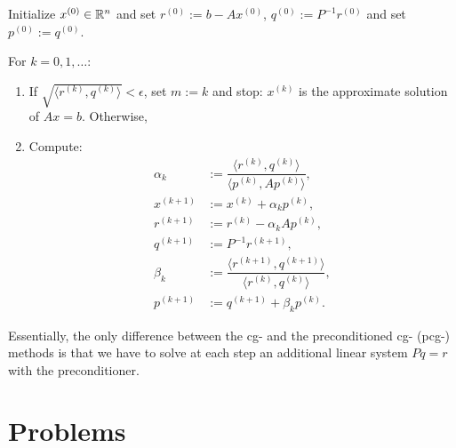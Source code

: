 \begin{algorithm}
Initialize $x^{(0)}\in\mathbb{R}^n$ and set $r^{(0)} :=b-Ax^{(0)}$, $q^{(0)} := P^{-1}r^{(0)}$ and set $p^{(0)} := q^{(0)}$.

For $k=0,1,\ldots$:
\begin{enumerate}
\item If $\sqrt{\langle r^{(k)},q^{(k)}\rangle} < \epsilon$, set $m:=k$ and stop: $x^{(k)}$ is the approximate solution of $Ax=b$. Otherwise,
\item Compute:
\begin{align*}
\alpha_k & := \dfrac{\langle r^{(k)}, q^{(k)}\rangle}{\langle p^{(k)}, Ap^{(k)}\rangle},\\
x^{(k+1)} & := x^{(k)} + \alpha_kp^{(k)},\\
r^{(k+1)} & := r^{(k)} - \alpha_k Ap^{(k)},\\
q^{(k+1)} & := P^{-1}r^{(k+1)},\\
\beta_k & := \dfrac{\langle r^{(k+1)}, q^{(k+1)}\rangle}{\langle r^{(k)}, q^{(k)}\rangle},\\
p^{(k+1)} & := q^{(k+1)} + \beta_k p^{(k)}.
\end{align*}
\end{enumerate}
\end{algorithm}

Essentially, the only difference between the cg- and the preconditioned cg- (pcg-) methods is that we have to solve at each step an additional linear system $Pq = r$ with the preconditioner.

\section{Problems}

